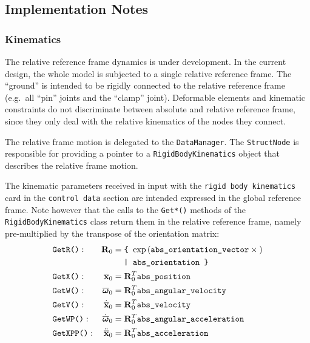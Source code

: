 \documentclass[10pt,dvips,fleqn,subeqn]{report}
\newcommand{\T}[1]{\bm{\mathbf{#1}}}
\newcommand{\TT}[1]{\bm{\mathbf{#1}}}
\begin{document}
\subsection{Implementation Notes}
\label{sec:nodes:structural nodes:implementation notes}

\subsubsection{Kinematics}
The relative reference frame dynamics is under development.
In the current design, the whole model is subjected 
to a single relative reference frame.
The ``ground'' is intended to be rigidly connected
to the relative reference frame (e.g.\ all ``pin'' joints
and the ``clamp'' joint).
Deformable elements and kinematic constraints do not discriminate
between absolute and relative reference frame, since they only deal
with the relative kinematics of the nodes they connect.

The relative frame motion is delegated to the \texttt{DataManager}.
The \texttt{StructNode} is responsible for providing a pointer
to a \texttt{RigidBodyKinematics} object that describes
the relative frame motion.

The kinematic parameters received in input with the
\texttt{rigid body kinematics} card in the \texttt{control data} section
are intended expressed in the global reference frame.
Note however that the calls to the \texttt{Get*()} methods
of the \texttt{RigidBodyKinematics} class return them
in the relative reference frame, namely pre-multiplied
by the transpose of the orientation matrix:
\begin{subequations}
\begin{align}
	& \texttt{GetR()}:
	& \TT{R}_0 &= \texttt{\{ } \mathrm{exp}\plbr{
		\texttt{abs\_orientation\_vector}\times{}
	} \nonumber \\
	& & & \hphantom{=} \texttt{ | abs\_orientation \} } \\
	& \texttt{GetX()}:
	& \overline{\T{x}}_0 &= \TT{R}_0^T \texttt{abs\_position} \\
	& \texttt{GetW()}:
	& \overline{\T{\omega}}_0 &= \TT{R}_0^T \texttt{abs\_angular\_velocity} \\
	& \texttt{GetV()}:
	& \dot{\overline{\T{x}}}_0 &= \TT{R}_0^T \texttt{abs\_velocity} \\
	& \texttt{GetWP()}:
	& \dot{\overline{\T{\omega}}}_0 &= \TT{R}_0^T \texttt{abs\_angular\_acceleration} \\
	& \texttt{GetXPP()}:
	& \ddot{\overline{\T{x}}}_0 &= \TT{R}_0^T \texttt{abs\_acceleration}
\end{align}
\end{subequations}
\end{document}
